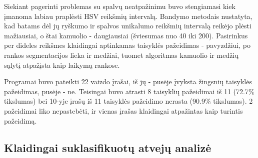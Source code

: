 \documentclass{VUMIFPSkursinis}
\begin{document}
Siekiant pagerinti problemas su spalvų neatpažinimu buvo stengiamasi kiek įmanoma labiau praplėsti HSV reikšmių intervalą. Bandymo metodais nustatyta, kad batams dėl jų ryškumo ir spalvos unikalumo reikšmių intervalą reikėjo plėsti mažiausiai, o štai kamuolio - daugiausiai (šviesumas nuo 40 iki 200). Pasirinkus per dideles reikšmes klaidingai aptinkamas taisyklės pažeidimas - pavyzdžiui, po rankos segmentacijos lieka ir medžiai, tuomet algoritmas kamuolio ir medžių sąlytį atpažįsta kaip laikymą rankose.


Programai buvo pateikti 22 vaizdo įrašai, iš jų - pusėje įvyksta žingsnių taisyklės pažeidimas, pusėje - ne. Teisingai buvo atrasti 8 taisyklių pažeidimai iš 11 (72.7\% tikslumas) bei 10-yje įrašų iš 11 taisyklės pažeidimo nerasta (90.9\% tikslumas). 2 pažeidimai liko nepastebėti, ir vienas įrašas klaidingai atpažintas kaip turintis pažeidimą. 


\subsection{Klaidingai suklasifikuotų atvejų analizė}
\end{document}
